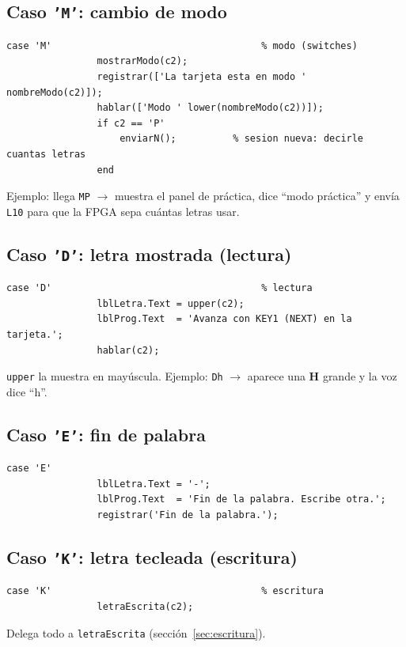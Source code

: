 \documentclass[11pt,a4paper]{article}
\newcommand{\cod}[1]{\texttt{#1}}
\begin{document}
\subsection{Caso \texttt{'M'}: cambio de modo}
\begin{lstlisting}[firstnumber=198]
            case 'M'                                     % modo (switches)
                mostrarModo(c2);
                registrar(['La tarjeta esta en modo ' nombreModo(c2)]);
                hablar(['Modo ' lower(nombreModo(c2))]);
                if c2 == 'P'
                    enviarN();          % sesion nueva: decirle cuantas letras
                end
\end{lstlisting}
Ejemplo: llega \cod{MP} $\rightarrow$ muestra el panel de práctica, dice ``modo
práctica'' y envía \cod{L10} para que la FPGA sepa cuántas letras usar.

\subsection{Caso \texttt{'D'}: letra mostrada (lectura)}
\begin{lstlisting}[firstnumber=206]
            case 'D'                                     % lectura
                lblLetra.Text = upper(c2);
                lblProg.Text  = 'Avanza con KEY1 (NEXT) en la tarjeta.';
                hablar(c2);
\end{lstlisting}
\cod{upper} la muestra en mayúscula. Ejemplo: \cod{Dh} $\rightarrow$ aparece una
\textbf{H} grande y la voz dice ``h''.

\subsection{Caso \texttt{'E'}: fin de palabra}
\begin{lstlisting}[firstnumber=211]
            case 'E'
                lblLetra.Text = '-';
                lblProg.Text  = 'Fin de la palabra. Escribe otra.';
                registrar('Fin de la palabra.');
\end{lstlisting}

\subsection{Caso \texttt{'K'}: letra tecleada (escritura)}
\begin{lstlisting}[firstnumber=216]
            case 'K'                                     % escritura
                letraEscrita(c2);
\end{lstlisting}
Delega todo a \cod{letraEscrita} (sección~\ref{sec:escritura}).
\end{document}
